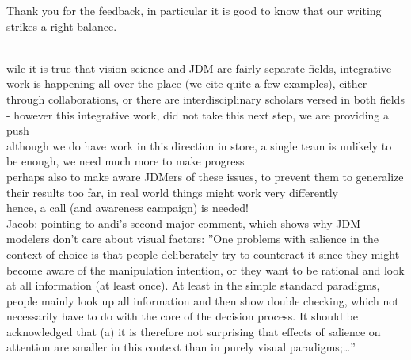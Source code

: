 Thank you for the feedback, in particular it is good to know that our writing strikes a right balance.



\\

wile it is true that vision science and JDM are fairly separate fields, integrative work is happening all over the place (we cite quite a few examples), either through collaborations, or there are interdisciplinary scholars versed in both fields - however this integrative work, did not take this next step, we are providing a push\\

although we do have work in this direction in store, a single team is unlikely to be enough, we need much more to make progress\\

perhaps also to make aware JDMers of these issues, to prevent them to generalize their results too far, in real world things might work very differently\\

hence, a call (and awareness campaign) is needed!\\

Jacob: pointing to andi’s second major comment, which shows why JDM modelers don’t care about visual factors: ”One problems with salience in the context of choice is that people deliberately try to counteract it since they might become aware of the manipulation intention, or they want to be rational and look at all information (at least once). At least in the simple standard paradigms, people mainly look up all information and then show double checking, which not necessarily have to do with the core of the decision process. It should be acknowledged that (a) it is therefore not surprising that effects of salience on attention are smaller in this context than in purely visual paradigms;…”


